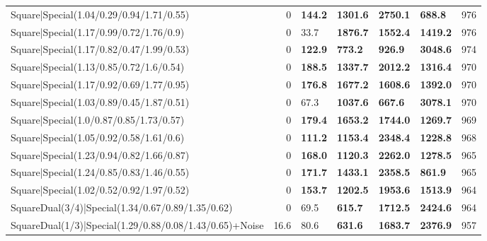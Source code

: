 \begin{tabular}{lrllllr}
 Square|Special(1.04/0.29/0.94/1.71/0.55)                      &             0   & \textbf{144.2} & \textbf{1301.6} & \textbf{2750.1} & \textbf{688.8}  &          976 \\
 Square|Special(1.17/0.99/0.72/1.76/0.9)                       &             0   & 33.7           & \textbf{1876.7} & \textbf{1552.4} & \textbf{1419.2} &          976 \\
 Square|Special(1.17/0.82/0.47/1.99/0.53)                      &             0   & \textbf{122.9} & \textbf{773.2}  & \textbf{926.9}  & \textbf{3048.6} &          974 \\
 Square|Special(1.13/0.85/0.72/1.6/0.54)                       &             0   & \textbf{188.5} & \textbf{1337.7} & \textbf{2012.2} & \textbf{1316.4} &          970 \\
 Square|Special(1.17/0.92/0.69/1.77/0.95)                      &             0   & \textbf{176.8} & \textbf{1677.2} & \textbf{1608.6} & \textbf{1392.0} &          970 \\
 Square|Special(1.03/0.89/0.45/1.87/0.51)                      &             0   & 67.3           & \textbf{1037.6} & \textbf{667.6}  & \textbf{3078.1} &          970 \\
 Square|Special(1.0/0.87/0.85/1.73/0.57)                       &             0   & \textbf{179.4} & \textbf{1653.2} & \textbf{1744.0} & \textbf{1269.7} &          969 \\
 Square|Special(1.05/0.92/0.58/1.61/0.6)                       &             0   & \textbf{111.2} & \textbf{1153.4} & \textbf{2348.4} & \textbf{1228.8} &          968 \\
 Square|Special(1.23/0.94/0.82/1.66/0.87)                      &             0   & \textbf{168.0} & \textbf{1120.3} & \textbf{2262.0} & \textbf{1278.5} &          965 \\
 Square|Special(1.24/0.85/0.83/1.46/0.55)                      &             0   & \textbf{171.7} & \textbf{1433.1} & \textbf{2358.5} & \textbf{861.9}  &          965 \\
 Square|Special(1.02/0.52/0.92/1.97/0.52)                      &             0   & \textbf{153.7} & \textbf{1202.5} & \textbf{1953.6} & \textbf{1513.9} &          964 \\
 SquareDual(3/4)|Special(1.34/0.67/0.89/1.35/0.62)             &             0   & 69.5           & \textbf{615.7}  & \textbf{1712.5} & \textbf{2424.6} &          964 \\
 SquareDual(1/3)|Special(1.29/0.88/0.08/1.43/0.65)+Noise       &            16.6 & 80.6           & \textbf{631.6}  & \textbf{1683.7} & \textbf{2376.9} &          957 \\

\end{tabular}
